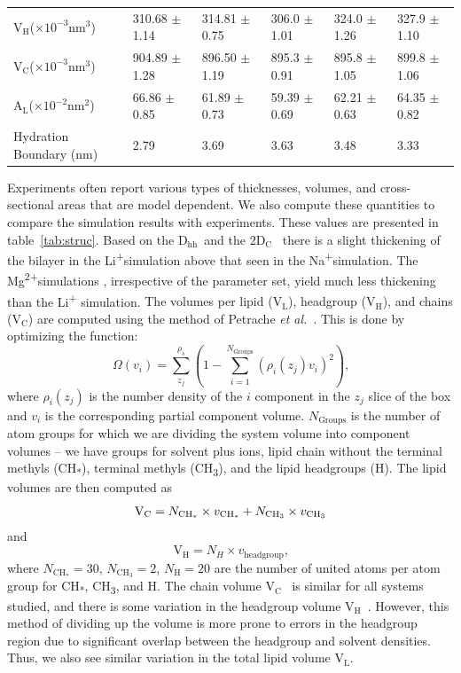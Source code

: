 \documentclass[12pt,openany,final]{book}
\newcommand{\etal}{\textit{et al.}}
\newcommand{\dhh}{$\text{D}_\text{hh}$}
\newcommand{\dc}{$\text{2D}_\text{C}$}
\newcommand{\al}{$\text{A}_{\text{L}}$}
\newcommand{\vl}{$\text{V}_{\text{L}}$}
\newcommand{\vh}{$\text{V}_{\text{H}}$}
\newcommand{\vc}{$\text{V}_{\text{C}}$}
\newcommand{\na}{Na\textsuperscript{+}}
\newcommand{\li}{Li\textsuperscript{+}}
\newcommand{\mg}{Mg\textsuperscript{2+}}
\begin{document}
\begin{table}
{\begin{tabularx}{\textwidth}{Y|Y|Y|Y|Y|Y}
        \vh  ($\times 10^{-3}\text{nm}^3$)&310.68  $\pm$ 1.14  &314.81  $\pm$ 0.75 &306.0  $\pm$ 1.01&324.0  $\pm$ 1.26  &327.9  $\pm$ 1.10\\
        \vc  ($\times 10^{-3}\text{nm}^3$)&904.89  $\pm$ 1.28  &896.50  $\pm$ 1.19 &895.3  $\pm$ 0.91&895.8  $\pm$ 1.05  &899.8  $\pm$ 1.06\\
        \al  ($\times 10^{-2}\text{nm}^2$)&66.86   $\pm$ 0.85  &61.89   $\pm$ 0.73 &59.39  $\pm$ 0.69&62.21  $\pm$ 0.63  &64.35  $\pm$ 0.82\\
        Hydration Boundary (nm) & 2.79 &3.69&3.63 &3.48&3.33  \\
\end{tabularx}}
\end{table}

Experiments often report various types of thicknesses, volumes, and cross-sectional areas that are model dependent.
We also compute these quantities to compare the simulation results with experiments. These values are presented in 
table~\ref{tab:struc}.
Based on the \dhh~and the \dc~ there is a slight thickening 
of the bilayer in the \li {simulation} above that seen in the \na {simulation}.
The \mg simulations {, irrespective of the parameter set, yield} much less thickening than {the}  
Li\textsuperscript{+} {simulation.} 
{The volumes per lipid (\vl), headgroup (\vh), and chains (\vc) are computed using the method of
Petrache \etal~\cite{petrache:1997}. This is done by optimizing the function:
\begin{equation}
    \label{eq:volumeobj}
    \Omega(v_i)=\sum^{\rho_s}_{z_j}(1-\sum^{N_{\text{Groups}}}_{i=1}{(\rho_i(z_j)v_i)^2})\text{,}
\end{equation}
where $\rho_i(z_j)$ is the number density of the $i$ component in the
$z_j$ slice of the box and $v_i$ is the corresponding partial component volume. $N_\text{Groups}$ is the number
of atom groups for which we are dividing the system volume into component volumes -- we have groups for solvent plus ions,
lipid chain without the terminal methyls (CH\textsubscript{*}), terminal methyls (CH\textsubscript{3}), and the lipid headgroups (H).
The lipid volumes are then computed as 
\begin{equation}
    \text{\vc}=N_{\text{CH}_*} \times v_{\text{CH}_*}+N_{\text{CH}_3} \times v_{\text{CH\textsubscript{3}}}
\end{equation}
and
\begin{equation}
    \text{\vh}=N_{H} \times v_{\text{headgroup}}\text{,}
\end{equation}
where $N_{\text{CH}_*}=30$, $N_{\text{CH}_3}=2$, $N_{\text{H}}=20$ are the number of united atoms per atom group for CH\textsubscript{*},
CH\textsubscript{3}, and H.
}{
The chain volume \vc~ is similar for all systems studied, and there is some variation in the headgroup volume \vh~.
However, this method of dividing up the volume is more prone to errors in the headgroup region due to 
significant overlap between the headgroup and solvent densities. 
Thus, we also see similar variation in the total lipid volume \vl. 
}
\end{document}
